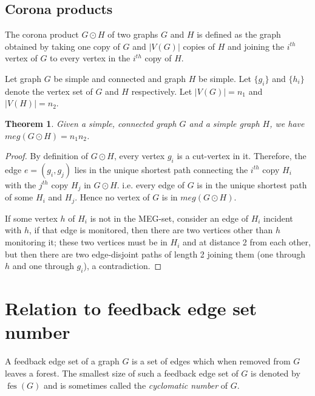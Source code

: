 \documentclass[10pt,a4paper]{article}
\newtheorem{theorem}{Theorem}[section]
\DeclareMathOperator{\fes}{fes}
\begin{document}
\subsection{Corona products}
The corona product $G \odot H$ of two graphs $G$ and $H$ is defined as the graph obtained by taking one copy of $G$ and $|V(G)|$ copies of $H$ and joining the $i^{th}$ vertex of $G$ to every vertex in the $i^{th}$ copy of $H$.

Let graph $G$ be simple and connected and graph $H$ be simple. Let $\{g_i\}$ and $\{h_i\}$ denote the vertex set of $G$ and $H$ respectively. Let $|V(G)| = n_1$ and $|V(H)| = n_2$.

\begin{theorem}
Given a simple, connected graph $G$ and a simple graph $H$, we have $meg(G \odot H) = n_1n_2$.
\end{theorem}
\begin{proof}
By definition of $G \odot H$, every vertex $g_i$ is a cut-vertex in it. Therefore, the edge $e = (g_i, g_j)$ lies in the unique shortest path connecting the $i^{th}$ copy $H_i$ with the $j^{th}$ copy $H_j$ in $G \odot H$. i.e. every edge of $G$ is in the unique shortest path of some $H_i$ and $H_j$. Hence no vertex of $G$ is in $meg(G \odot H)$.

If some vertex $h$ of $H_i$ is not in the MEG-set, consider an edge of $H_i$ incident with $h$, if that edge is monitored, then there are two vertices other than $h$ monitoring it; these two vertices must be in $H_i$ and at distance 2 from each other, but then there are two edge-disjoint paths of length 2 joining them (one through $h$ and one through $g_i$), a contradiction.
\end{proof}


\section{Relation to feedback edge set number}\label{sec:fes}
A feedback edge set of a graph $G$ is a set of edges which when removed from $G$ leaves a forest. The smallest size of such a feedback edge set of $G$ is denoted by $\fes(G)$ and is sometimes called the \emph{cyclomatic number} of $G$.
\end{document}
